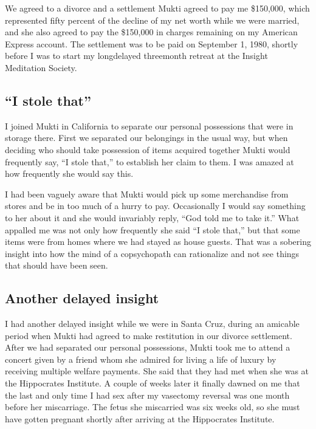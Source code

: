 \documentclass[a5paper,10pt,english]{book}
\begin{document}
\sphinxAtStartPar
We agreed to a divorce and a settlement Mukti agreed to pay me \$150,000,
which represented fifty percent of the decline of my net worth while we
were married, and she also agreed to pay the \$150,000 in charges
remaining on my American Express account. The settlement was to be paid
on September 1, 1980, shortly before I was to start my long\sphinxhyphen{}delayed
three\sphinxhyphen{}month retreat at the Insight Meditation Society.


\subsection{“I stole that”}
\label{\detokenize{psychopaths:i-stole-that}}
\sphinxAtStartPar
I joined Mukti in California to separate our personal possessions that
were in storage there. First we separated our belongings in the usual
way, but when deciding who should take possession of items acquired
together Mukti would frequently say, “I stole that,” to establish her
claim to them. I was amazed at how frequently she would say this.

\sphinxAtStartPar
I had been vaguely aware that Mukti would pick up some merchandise from
stores and be in too much of a hurry to pay. Occasionally I would say
something to her about it and she would invariably reply, “God told me
to take it.” What appalled me was not only how frequently she said “I
stole that,” but that some items were from homes where we had stayed as
house guests. That was a sobering insight into how the mind of a
co\sphinxhyphen{}psychopath can rationalize and not see things that should have been
seen.


\subsection{Another delayed insight}
\label{\detokenize{psychopaths:another-delayed-insight}}
\sphinxAtStartPar
I had another delayed insight while we were in Santa Cruz, during an
amicable period when Mukti had agreed to make restitution in our divorce
settlement. After we had separated our personal possessions, Mukti took
me to attend a concert given by a friend whom she admired for living a
life of luxury by receiving multiple welfare payments. She said that
they had met when she was at the Hippocrates Institute. A couple of
weeks later it finally dawned on me that the last and only time I had
sex after my vasectomy reversal was one month before her miscarriage.
The fetus she miscarried was six weeks old, so she must have gotten
pregnant shortly after arriving at the Hippocrates Institute.
\end{document}
